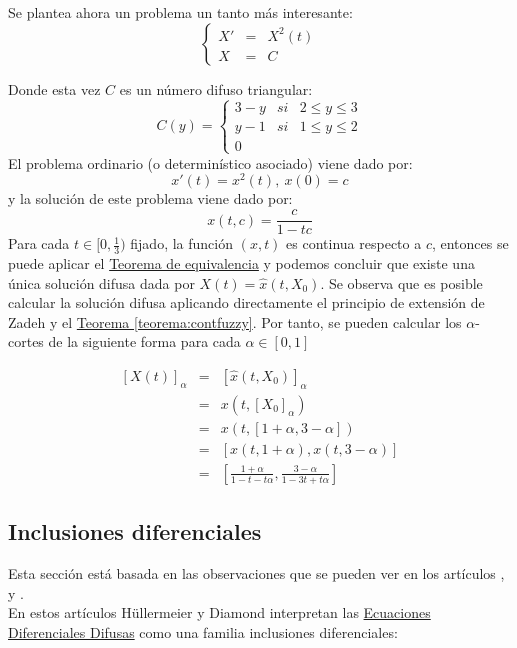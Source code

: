 \begin{ejemplo}
	Se plantea ahora un problema un tanto más interesante:
	\[
		\left\{
			\begin{array}{ccc}
				X' & = & X^2(t) \\
				X & =  & C
			\end{array}
		\right.
	\]
	
	Donde esta vez $C$ es un número difuso triangular:
	\[
		C(y) = \left\{
			\begin{array}{ccc}
				3 - y & si & 2 \leq y \leq 3 \\
				y - 1 & si & 1 \leq y \leq 2 \\
				0 
			\end{array}
		\right.
	\]
	El problema ordinario (o determinístico asociado) viene dado por:
	\[
		x'(t) = x^2(t), ~ x(0) = c
	\]
	y la solución de este problema viene dado por:
	\[
		x(t, c) = \frac{c}{1-tc}
	\]
	Para cada $t \in [0, \frac{1}{3})$ fijado, la función $(x, t)$ es continua respecto a $c$, entonces se puede aplicar el \hyperref[teorema:equivalencia]{Teorema de equivalencia} y podemos concluir que existe una única solución difusa dada por $X(t) = \hat{x}(t, X_0)$. Se observa que es posible calcular la solución difusa aplicando directamente el principio de extensión de Zadeh y el \hyperref[teorema:contfuzzy]{Teorema \ref*{teorema:contfuzzy}}. Por tanto, se pueden calcular los $\alpha$-cortes de la siguiente forma para cada $\alpha \in [0, 1]$
	
	\[
		\begin{array}{ccc}
			[X(t)]_\alpha & = & [\hat{x}(t, X_0)]_\alpha \\
			& = & x(t, [X_0]_\alpha) \\
			& = & x(t, [1+\alpha, 3-\alpha]) \\
			& = & [x(t, 1+\alpha), x(t, 3-\alpha)] \\
			& = & \left[
				\frac{1+\alpha}{1-t-t\alpha}, \frac{3-\alpha}{1-3t + t\alpha}
			\right]
		\end{array}
	\]
\end{ejemplo}

\subsection{Inclusiones diferenciales}
Esta sección está basada en las observaciones que se pueden ver en los artículos \cite{inclusionesdif1}, \cite{inclusionesdif2} y \cite{inclusionesdif3}. \\

En estos artículos Hüllermeier y Diamond interpretan las  \hyperref[def:edf]{Ecuaciones Diferenciales Difusas} como una familia inclusiones diferenciales:

